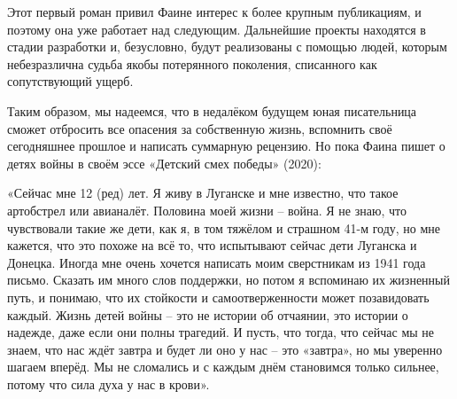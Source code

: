 Этот первый роман привил Фаине интерес к более крупным публикациям, и поэтому
она уже работает над следующим. Дальнейшие проекты находятся в стадии
разработки и, безусловно, будут реализованы с помощью людей, которым
небезразлична судьба якобы потерянного поколения, списанного как сопутствующий
ущерб.

Таким образом, мы надеемся, что в недалёком будущем юная писательница сможет
отбросить все опасения за собственную жизнь, вспомнить своё сегодняшнее прошлое
и написать суммарную рецензию. Но пока Фаина пишет о детях войны в своём эссе
«Детский смех победы» (2020):

«Сейчас мне 12 (ред) лет. Я живу в Луганске и мне известно, что такое
артобстрел или авианалёт. Половина моей жизни – война. Я не знаю, что
чувствовали такие же дети, как я, в том тяжёлом и страшном 41-м году, но мне
кажется, что это похоже на всё то, что испытывают сейчас дети Луганска и
Донецка. Иногда мне очень хочется написать моим сверстникам из 1941 года
письмо. Сказать им много слов поддержки, но потом я вспоминаю их жизненный
путь, и понимаю, что их стойкости и самоотверженности может позавидовать
каждый. Жизнь детей войны – это не истории об отчаянии, это истории о надежде,
даже если они полны трагедий. И пусть, что тогда, что сейчас мы не знаем, что
нас ждёт завтра и будет ли оно у нас – это «завтра», но мы уверенно шагаем
вперёд. Мы не сломались и с каждым днём становимся только сильнее, потому что
сила духа у нас в крови».

